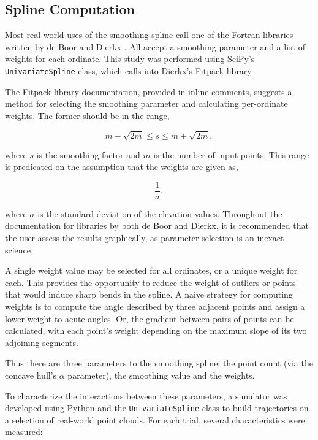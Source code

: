 \documentclass[doc]{apa6}
\begin{document}
\subsection{Spline Computation}

Most real-world uses of the smoothing spline call one of the Fortran libraries written by de Boor \parencite{deBoor1980} and Dierkx \parencite{Dierckx:1993:CSF:151103}. All accept a smoothing parameter and a list of weights for each ordinate. This study was performed using SciPy's \lstinline{UnivariateSpline}{} class, which calls into Dierkx's Fitpack library. 

The Fitpack library documentation, provided in inline comments, suggests a method for selecting the smoothing parameter and calculating per-ordinate weights. The former should be in the range,

\begin{equation} \label{eq:s_range}
m - \sqrt{2m} \leq s \leq m + \sqrt{2m},
\end{equation}

where $s$ is the smoothing factor and $m$ is the number of input points. This range is predicated on the assumption that the weights are given as,

\begin{equation}\label{eq:recip_weight}
\frac{1}{\sigma},
\end{equation}

where $\sigma$ is the standard deviation of the elevation values. Throughout the documentation for libraries by both de Boor and Dierkx, it is recommended that the user assess the results graphically, as parameter selection is an inexact science. 

A single weight value may be selected for all ordinates, or a unique weight for each. This provides the opportunity to reduce the weight of outliers or points that would induce sharp bends in the spline. A naive strategy for computing weights is to compute the angle described by three adjacent points and assign a lower weight to acute angles. Or, the gradient between pairs of points can be calculated, with each point's weight depending on the maximum slope of its two adjoining segments.

Thus there are three parameters to the smoothing spline: the point count (via the concave hull's $\alpha$ parameter), the smoothing value and the weights. 

To characterize the interactions between these parameters, a simulator was developed using Python and the \lstinline{UnivariateSpline}{} class to build trajectories on a selection of real-world point clouds. For each trial, several characteristics were measured:
\end{document}

